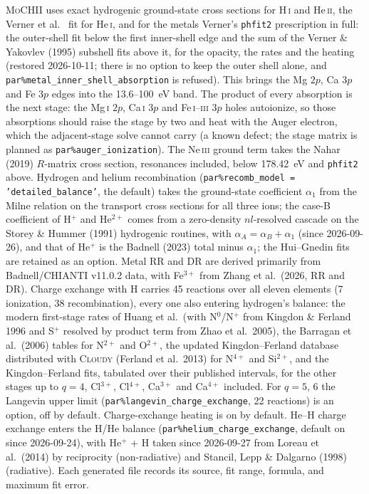 \documentclass[english,a4paper]{my_memo}
\newcommand{\code}[1]{\texttt{#1}}
\newcommand{\MoCHII}{\textsc{MoCHII}}
\newcommand{\Cloudy}{\textsc{Cloudy}}
\newcommand{\HI}{H\,\textsc{i}}
\newcommand{\HeI}{He\,\textsc{i}}
\newcommand{\HeII}{He\,\textsc{ii}}
\begin{document}
\MoCHII{} uses exact hydrogenic ground-state cross sections for \HI{} and
\HeII{}, the Verner et al.\ \cite{verner1996} fit for \HeI{}, and for the
metals Verner's \code{phfit2} prescription in full: the outer-shell fit
below the first inner-shell edge and the sum of the Verner \& Yakovlev
(1995) subshell fits above it, for the opacity, the rates and the heating
(restored 2026-10-11; there is no option to keep the outer shell alone, and
\code{par\%metal\_inner\_shell\_absorption} is refused).  This brings the
Mg $2p$, Ca $3p$ and Fe $3p$ edges into the 13.6--100~eV band.  The product
of every absorption is the next stage: the Mg\,\textsc{i} $2p$,
Ca\,\textsc{i} $3p$ and Fe\,\textsc{i}--\textsc{iii} $3p$ holes autoionize,
so those absorptions should raise the stage by two and heat with the Auger
electron, which the adjacent-stage solve cannot carry (a known defect; the
stage matrix is planned as \code{par\%auger\_ionization}).  The
Ne\,\textsc{iii} ground term takes the Nahar (2019) $R$-matrix cross
section, resonances included, below 178.42~eV and \code{phfit2} above.
Hydrogen and helium recombination (\code{par\%recomb\_model =
'detailed\_balance'}, the default) takes the ground-state coefficient
$\alpha_1$ from the Milne relation on the transport cross sections for all
three ions; the case-B coefficient of H$^+$ and He$^{2+}$ comes from a
zero-density $nl$-resolved cascade on the Storey \& Hummer (1991) hydrogenic
routines, with $\alpha_A=\alpha_B+\alpha_1$ (since 2026-09-26), and that of
He$^+$ is the Badnell (2023) total minus $\alpha_1$; the Hui--Gnedin fits are
retained as an option.  Metal RR and DR are derived primarily from
Badnell/CHIANTI v11.0.2 data, with Fe$^{3+}$ from Zhang et al.\ (2026, RR
and DR).  Charge exchange with H carries 45 reactions over all eleven
elements (7 ionization, 38 recombination), every one also entering
hydrogen's balance: the modern first-stage
rates of Huang et al.\ (with N$^0$/N$^+$ from Kingdon \& Ferland 1996 and
S$^+$ resolved by product term from Zhao et al.\ 2005), the Barragan et
al.\ (2006) tables for N$^{2+}$ and O$^{2+}$, the updated Kingdon--Ferland
database distributed with \Cloudy{} (Ferland et al.\ 2013) for N$^{4+}$ and
Si$^{2+}$, and the Kingdon--Ferland fits, tabulated over their published
intervals, for the other stages up to $q=4$, Cl$^{3+}$, Cl$^{4+}$,
Ca$^{3+}$ and Ca$^{4+}$ included.  For $q = 5$, 6 the Langevin upper limit
(\code{par\%langevin\_charge\_exchange}, 22 reactions) is an option, off by
default.  Charge-exchange heating is on by default.  He--H charge exchange enters the H/He
balance (\code{par\%helium\_charge\_exchange}, default on since 2026-09-24),
with He$^+$ + H taken since 2026-09-27 from Loreau et al.\ (2014) by
reciprocity (non-radiative) and Stancil, Lepp \& Dalgarno (1998)
(radiative).  Each generated file records its source,
fit range, formula, and maximum fit error.
\end{document}
